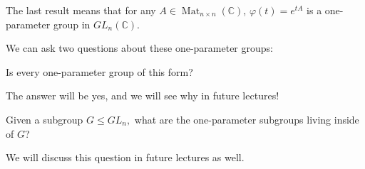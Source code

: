 The last result means that for any $A \in \operatorname{Mat}_{n \times n}(\mathbb{C})$, $\varphi(t) = e^{tA}$ is a one-parameter group in $GL_n(\mathbb{C})$. 

We can ask two questions about these one-parameter groups:

\begin{qq}
Is every one-parameter group of this form?
\end{qq}

The answer will be yes, and we will see why in future lectures!

\begin{qq}
Given a subgroup $G \leq GL_n,$ what are the one-parameter subgroups living inside of $G$?
\end{qq}

We will discuss this question in future lectures as well. 

\newpage